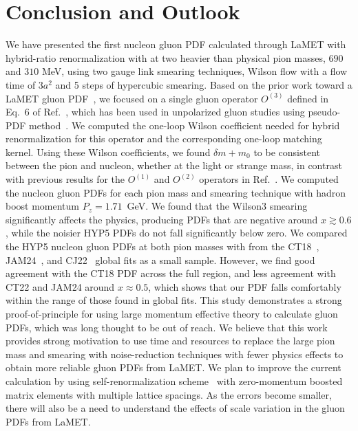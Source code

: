 \section{Conclusion and Outlook}
\label{sec:conclusion}

We have presented the first nucleon gluon PDF calculated through LaMET with hybrid-ratio renormalization with at two heavier than physical pion masses, $690$ and $310$ MeV, using two gauge link smearing techniques, Wilson flow with a flow time of $3a^2$ and 5 steps of hypercubic smearing.
Based on the prior work toward a LaMET gluon PDF~\cite{Good:2024iur}, we focused on a single gluon operator $O^{(3)}$ defined in Eq.~6 of Ref.~\cite{Good:2024iur}, which has been used in unpolarized gluon studies using pseudo-PDF method~\cite{Fan:2020cpa,Fan:2021bcr,HadStruc:2021wmh,Salas-Chavira:2021wui,Fan:2022kcb,Delmar:2023agv,Good:2023ecp}.
We computed the one-loop Wilson coefficient needed for hybrid renormalization for this operator and the corresponding one-loop matching kernel.
Using these Wilson coefficients, we found $\delta m+m_0$ to be consistent between the pion and nucleon, whether at the light or strange mass, in contrast with previous results for the $O^{(1)}$ and $O^{(2)}$ operators in Ref.~\cite{Good:2024iur}.
We computed the nucleon gluon PDFs for each pion mass and smearing technique with hadron boost momentum $P_z = 1.71$~GeV.
We found that the Wilson3 smearing significantly affects the physics, producing PDFs that are negative around $x \gtrsim 0.6$, while the noisier HYP5 PDFs do not fall significantly below zero.
We compared the HYP5 nucleon gluon PDFs at both pion masses with from the CT18~\cite{Hou:2019efy}, JAM24~\cite{Anderson:2024evk}, and CJ22~\cite{Cerutti:2025yji} global fits as a small sample.
However, we find good agreement with the CT18 PDF across the full region, and less agreement with CT22 and JAM24 around $x\approx 0.5$, which shows that our PDF falls comfortably within the range of those found in global fits.
This study demonstrates a strong proof-of-principle for using large momentum effective theory to calculate gluon PDFs, which was long thought to be out of reach.
We believe that this work provides strong motivation to use time and resources to replace the large pion mass and smearing with noise-reduction techniques with fewer physics effects to obtain more reliable gluon PDFs from LaMET.
We plan to improve the current calculation by using self-renormalization scheme~\cite{LatticePartonLPC:2021gpi} with zero-momentum boosted matrix elements with multiple lattice spacings.
As the errors become smaller, there will also be a need to understand the effects of scale variation in the gluon PDFs from LaMET.

